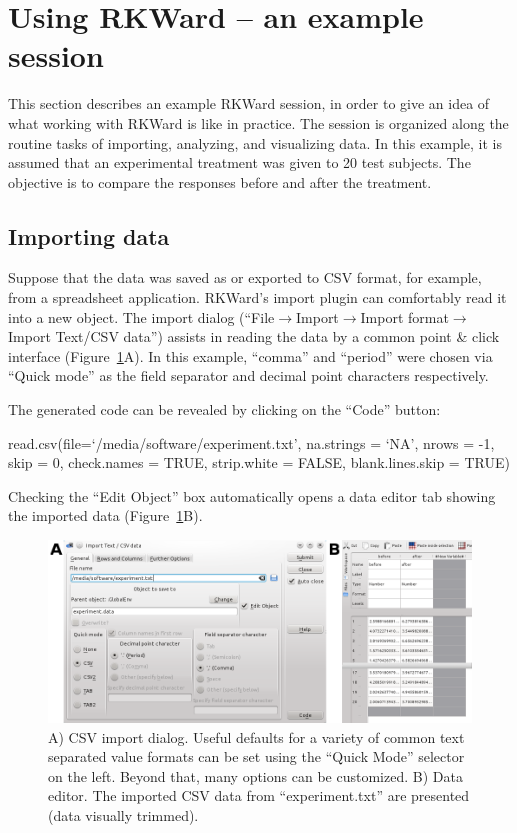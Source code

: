 \section{Using RKWard -- an example session}
\label{sec:using_RKWard}
This section describes an example RKWard session, in order to give an idea
of what working with RKWard is like in practice.
The session is organized along the routine tasks of importing,
analyzing, and visualizing data. In this example, it is assumed that an experimental
treatment was given to 20 test subjects. The objective is to compare the responses 
before and after the treatment. 

\subsection{Importing data}
\label{sec:importing_data}
Suppose that the data was saved as or exported to CSV format, for example, from a 
spreadsheet application. RKWard's import plugin can
comfortably read it into a new  object.
The import dialog (``File$\rightarrow$Import$\rightarrow$Import
format$\rightarrow$Import Text/CSV data'') assists in reading the
data by a common point \& click interface (Figure~\ref{fig:import_data}A). In this
example, ``comma'' and ``period'' were chosen via ``Quick mode'' as the field
separator and decimal point characters respectively.

The generated  code can be revealed by clicking on the ``Code'' button:

\begin{Code}
read.csv(file=`/media/software/experiment.txt',
         na.strings = `NA', nrows = -1, skip = 0,
         check.names = TRUE, strip.white = FALSE, blank.lines.skip = TRUE)
\end{Code}

Checking the ``Edit Object'' box automatically opens a data editor tab
showing the imported data (Figure~\ref{fig:import_data}B).

\begin{figure}[b!]
 \centering
 \includegraphics[width=15.5cm]{../figures/import_data.png}
 \caption{A) CSV import dialog. Useful defaults for a variety of common text separated value formats can
  be set using the ``Quick Mode'' selector on the left. Beyond that, many options can be customized. B) Data editor. The imported CSV
  data from ``experiment.txt'' are presented (data visually trimmed).}
 \label{fig:import_data}
\end{figure}

